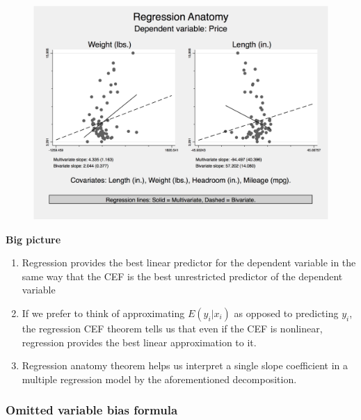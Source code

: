 \documentclass[notes=show]{beamer}
\begin{document}
\begin{frame}[plain,shrink=20]

	\begin{figure}[h]
	\includegraphics[scale=0.45]{./lecture_includes/reganat_2.png}
	\end{figure}

\end{frame}
	

	



\begin{frame}[plain]
	\begin{center}
	\textbf{Big picture}
	\end{center}
	
	\begin{enumerate}
	\item Regression provides the best linear predictor for the dependent variable in the same way that the CEF is the best unrestricted predictor of the dependent variable
	\item If we prefer to think of approximating $E(y_i|x_i)$ as opposed to predicting $y_i$, the regression CEF theorem tells us that even if the CEF is nonlinear, regression provides the best linear approximation to it.
	\item Regression anatomy theorem helps us interpret a single slope coefficient in a multiple regression model by the aforementioned decomposition.
	\end{enumerate}
\end{frame}




\subsubsection{Omitted variable bias formula}
\end{document}
